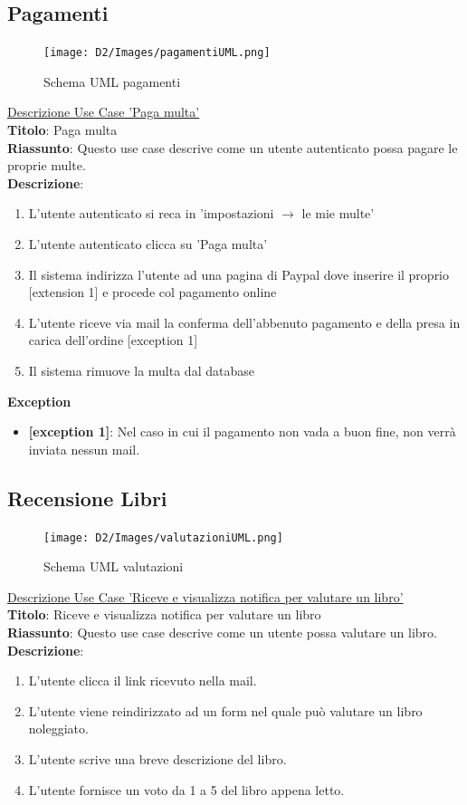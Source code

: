 \documentclass{article}
\begin{document}
    

    \subsection{Pagamenti}
\begin{figure}[H]
    \centering
    \texttt{[image: D2/Images/pagamentiUML.png]}
    \caption{Schema UML pagamenti}
\end{figure}

\noindent\underline{Descrizione Use Case 'Paga multa'}\\
\textbf{Titolo}: Paga multa\\
\textbf{Riassunto}: Questo use case descrive come un utente autenticato possa pagare le proprie multe.\\
\textbf{Descrizione}: 
\begin{enumerate}
    \item L'utente autenticato si reca in 'impostazioni $\rightarrow$ le mie multe' 
    \item L'utente autenticato clicca su 'Paga multa'
    \item Il sistema indirizza l'utente ad una pagina di Paypal dove inserire il proprio [extension 1] e procede col pagamento online
    \item L'utente riceve via mail la conferma dell'abbenuto pagamento e della presa in carica dell'ordine [exception 1]
    \item Il sistema rimuove la multa dal database
\end{enumerate}
\textbf{Exception}
\begin{itemize}
    \item \textbf{[exception 1]}: Nel caso in cui il pagamento non vada a buon fine, non verrà inviata nessun mail.
\end{itemize}


    
    \subsection{Recensione Libri}
\begin{figure}[H]
    \centering
    \texttt{[image: D2/Images/valutazioniUML.png]}
    \caption{Schema UML valutazioni}
\end{figure}

\noindent\underline{Descrizione Use Case 'Riceve e visualizza notifica per valutare un libro'}\\
\textbf{Titolo}: Riceve e visualizza notifica per valutare un libro\\
\textbf{Riassunto}: Questo use case descrive come un utente possa valutare un libro.\\
\textbf{Descrizione}: 
\begin{enumerate}
    \item L'utente clicca il link ricevuto nella mail.
    \item L'utente viene reindirizzato ad un form nel quale può valutare un libro noleggiato.
    \item L'utente scrive una breve descrizione del libro.
    \item L'utente fornisce un voto da 1 a 5 del libro appena letto.
\end{enumerate}
\end{document}
